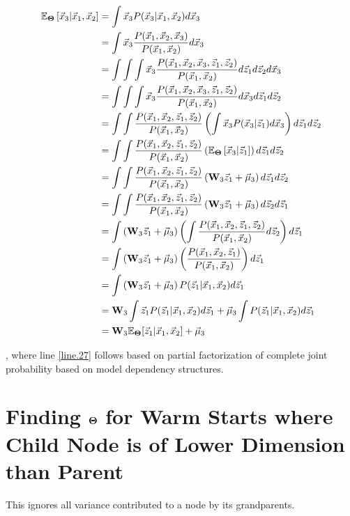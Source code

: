 \begin{align}
    \mathbb{E}_{\bold{\Theta}} \left[ \vec{x}_3 | \vec{x}_1, \vec{x}_2 \right] &= \int \vec{x}_3 P(\vec{x}_3 | \vec{x}_1, \vec{x}_2) d\vec{x}_3 \\
    &= \int \vec{x}_3 \frac{P(\vec{x}_1, \vec{x}_2, \vec{x}_3)}{P(\vec{x}_1, \vec{x}_2)} d\vec{x}_3 \\
    &= \int \int \int \vec{x}_3 \frac{ P(\vec{x}_1, \vec{x}_2, \vec{x}_3 , \vec{z}_1, \vec{z}_2) }{P(\vec{x}_1, \vec{x}_2)} d \vec{z}_1 d\vec{z}_2 d\vec{x}_3 \\ 
    &= \int \int \int \vec{x}_3 \frac{ P(\vec{x}_1, \vec{x}_2, \vec{x}_3 , \vec{z}_1, \vec{z}_2) }{P(\vec{x}_1, \vec{x}_2)} d \vec{x}_3 d\vec{z}_1 d\vec{z}_2 \\ 
    &= \int \int \frac{P(\vec{x}_1, \vec{x}_2, \vec{z}_1, \vec{z}_2)}{P(\vec{x}_1, \vec{x}_2)} \left( \int \vec{x}_3 P(\vec{x}_3 | \vec{z}_1) d \vec{x}_3 \right) d\vec{z}_1 d\vec{z}_2 \label{line.27} \\ 
    &= \int \int \frac{P(\vec{x}_1, \vec{x}_2, \vec{z}_1, \vec{z}_2)}{P(\vec{x}_1, \vec{x}_2)} \left( \mathbb{E}_{\bold{\Theta}} \left[ \vec{x}_3 | \vec{z}_1 \right] \right) d\vec{z}_1 d\vec{z}_2 \\ 
    &= \int \int \frac{P(\vec{x}_1, \vec{x}_2, \vec{z}_1, \vec{z}_2)}{P(\vec{x}_1, \vec{x}_2)} \left( \bold{W}_3 \vec{z}_1 + \vec{\mu}_3 \right) d\vec{z}_1 d\vec{z}_2 \\ 
    &= \int \int \frac{P(\vec{x}_1, \vec{x}_2, \vec{z}_1, \vec{z}_2)}{P(\vec{x}_1, \vec{x}_2)}
      \left( \bold{W}_3 \vec{z}_1 + \vec{\mu}_3 \right) d\vec{z}_2 d\vec{z}_1  \\ 
    &= \int \left( \bold{W}_3 \vec{z}_1 + \vec{\mu}_3 \right) \left( \int \frac{P(\vec{x}_1, \vec{x}_2, \vec{z}_1, \vec{z}_2)}{P(\vec{x}_1, \vec{x}_2)} d\vec{z}_2 \right) d\vec{z}_1 \\ 
    &= \int \left( \bold{W}_3 \vec{z}_1 + \vec{\mu}_3 \right) \left( \frac{P(\vec{x}_1, \vec{x}_2, \vec{z}_1)}{P(\vec{x}_1, \vec{x}_2)} \right) d\vec{z}_1 \\     
    &= \int \left( \bold{W}_3 \vec{z}_1 + \vec{\mu}_3 \right) P(\vec{z}_1 | \vec{x}_1, \vec{x}_2) d\vec{z}_1 \\
    &= \bold{W}_3 \int \vec{z}_1 P(\vec{z}_1 | \vec{x}_1, \vec{x}_2)  d \vec{z}_1 + \vec{\mu}_3 \int P(\vec{z}_1 | \vec{x}_1, \vec{x}_2) d \vec{z}_1 \\ 
    &= \bold{W}_3 \mathbb{E}_{\bold{\Theta}} [\vec{z}_1 | \vec{x}_1, \vec{x}_2] + \vec{\mu}_3
\end{align}

, where line \ref{line.27} follows based on partial factorization of
complete joint probability based on model dependency structures.

\pagebreak

\section{Finding $\bold{\Theta}$ for Warm Starts where Child Node is of
  Lower Dimension than Parent}

This ignores all variance contributed to a node by its grandparents. \\

